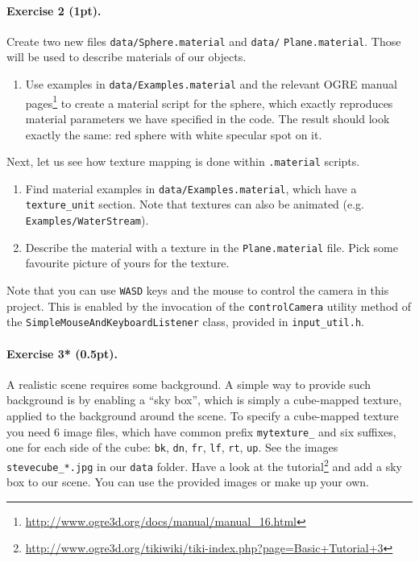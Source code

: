 \documentclass{article}
\newenvironment{exercise}[2]{\paragraph{Exercise #1 (#2pt).} }{
\medskip}
\begin{document}
\begin{exercise}{2}{1}
Create two new files \verb#data/Sphere.material# and \verb#data/# \verb#Plane.material#. Those will be used to describe materials of our objects.
\begin{enumerate}
	\item[1.] Use examples in \verb#data/Examples.material# and the relevant OGRE manual pages\footnote{\url{http://www.ogre3d.org/docs/manual/manual_16.html}} to create a material script for the sphere, which exactly reproduces material parameters we have specified in the code. The result should look exactly the same: red sphere with white specular spot on it.
\end{enumerate}
Next, let us see how texture mapping is done within \verb#.material# scripts.
\begin{enumerate}
	\item[2.] Find material examples in \verb#data/Examples.material#, which have a \\ \verb#texture_unit# section. Note that textures can also be animated (e.g. \verb#Examples/WaterStream#).
	\item[3.] Describe the material with a texture in the \verb#Plane.material# file. Pick some favourite picture of yours for the texture.
\end{enumerate}
Note that you can use \verb#WASD# keys and the mouse to control the camera in this project. This is enabled by the invocation of the \texttt{controlCamera} utility method of the \texttt{SimpleMouseAndKeyboardListener} class, provided in \verb#input_util.h#.

\end{exercise}

\begin{exercise}{3*}{0.5}
A realistic scene requires some background. A simple way to provide such background is by enabling a ``sky box'', which is simply a cube-mapped texture, applied to the background around the scene. To specify a cube-mapped texture you need 6 image files, which have common prefix \verb#mytexture_# and six suffixes, one for each side of the cube: \verb#bk#, \verb#dn#, \verb#fr#, \verb#lf#, \verb#rt#, \verb#up#. See the images \verb#stevecube_*.jpg# in our \verb#data# folder. Have a look at the tutorial\footnote{\url{http://www.ogre3d.org/tikiwiki/tiki-index.php?page=Basic+Tutorial+3}} and add a sky box to our scene. You can use the provided images or make up your own.
\end{exercise}
\end{document}
